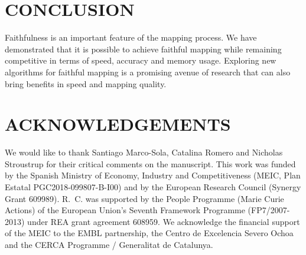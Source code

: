 \documentclass[english]{article}
\begin{document}
\section{CONCLUSION}

Faithfulness is an important feature of the mapping process. We have
demonstrated that it is possible to achieve faithful mapping while
remaining competitive in terms of speed, accuracy and memory usage.
Exploring new algorithms for faithful mapping is a promising avenue of
research that can also bring benefits in speed and mapping quality.


\section{ACKNOWLEDGEMENTS}

We would like to thank Santiago Marco-Sola, Catalina Romero and Nicholas
Stroustrup for their critical comments on the manuscript.
This work was funded by the Spanish Ministry of Economy, Industry and
Competitiveness (MEIC, Plan Estatal PGC2018-099807-B-I00) and by the
European Research Council (Synergy Grant 609989). R.~C. was supported by
the People Programme (Marie Curie Actions) of the European Union's Seventh
Framework Programme (FP7/2007-2013) under REA grant agreement 608959. We
acknowledge the financial support of the MEIC to the EMBL partnership, the
Centro de Excelencia Severo Ochoa and the CERCA Programme / Generalitat de
Catalunya.



\end{document}

